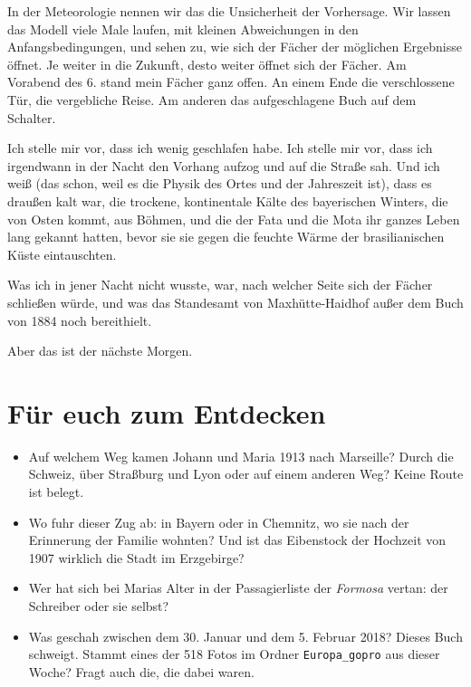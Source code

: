\documentclass[
  ngerman,
  11pt,
  openany]{book}
\providecommand{\tightlist}{%
  \setlength{\itemsep}{0pt}\setlength{\parskip}{0pt}}
\begin{document}
In der Meteorologie nennen wir das die Unsicherheit der Vorhersage. Wir
lassen das Modell viele Male laufen, mit kleinen Abweichungen in den
Anfangsbedingungen, und sehen zu, wie sich der Fächer der möglichen
Ergebnisse öffnet. Je weiter in die Zukunft, desto weiter öffnet sich
der Fächer. Am Vorabend des 6. stand mein Fächer ganz offen. An einem
Ende die verschlossene Tür, die vergebliche Reise. Am anderen das
aufgeschlagene Buch auf dem Schalter.

Ich stelle mir vor, dass ich wenig geschlafen habe. Ich stelle mir vor,
dass ich irgendwann in der Nacht den Vorhang aufzog und auf die Straße
sah. Und ich weiß (das schon, weil es die Physik des Ortes und der
Jahreszeit ist), dass es draußen kalt war, die trockene, kontinentale
Kälte des bayerischen Winters, die von Osten kommt, aus Böhmen, und die
der Fata und die Mota ihr ganzes Leben lang gekannt hatten, bevor sie
sie gegen die feuchte Wärme der brasilianischen Küste eintauschten.

Was ich in jener Nacht nicht wusste, war, nach welcher Seite sich der
Fächer schließen würde, und was das Standesamt von Maxhütte-Haidhof
außer dem Buch von 1884 noch bereithielt.

Aber das ist der nächste Morgen.

\section{Für euch zum Entdecken}\label{fuxfcr-euch-zum-entdecken-15}

\begin{itemize}
\tightlist
\item
  Auf welchem Weg kamen Johann und Maria 1913 nach Marseille? Durch die
  Schweiz, über Straßburg und Lyon oder auf einem anderen Weg? Keine
  Route ist belegt.
\item
  Wo fuhr dieser Zug ab: in Bayern oder in Chemnitz, wo sie nach der
  Erinnerung der Familie wohnten? Und ist das Eibenstock der Hochzeit
  von 1907 wirklich die Stadt im Erzgebirge?
\item
  Wer hat sich bei Marias Alter in der Passagierliste der \emph{Formosa}
  vertan: der Schreiber oder sie selbst?
\item
  Was geschah zwischen dem 30. Januar und dem 5. Februar 2018? Dieses
  Buch schweigt. Stammt eines der 518 Fotos im Ordner
  \texttt{Europa\_gopro} aus dieser Woche? Fragt auch die, die dabei
  waren.
\end{itemize}
\end{document}
